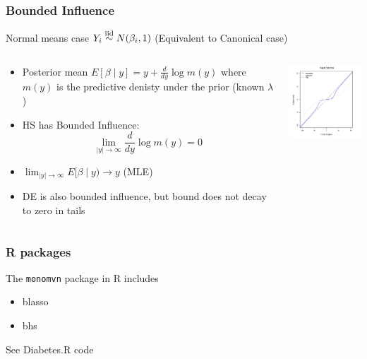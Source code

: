 \documentclass[]{beamer}
\begin{document}
\begin{frame}
  \frametitle{Bounded Influence}
Normal means case      $Y_i \mathrel{\mathop{\sim}\limits^{\rm iid}} N(\beta_i, 1)$    (Equivalent to Canonical case)
    \begin{columns}
    \begin{column}{.48\textwidth}
      \begin{itemize}
      \item 
Posterior mean
$E[\beta \mid y] = y + \frac{d} {d y} \log m(y)$
where $m(y)$ is the predictive denisty under the prior (known $\lambda$) \pause
\item HS has Bounded Influence: $$\lim_{|y| \to \infty} \frac{d}{dy} \log m(y) = 0$$ \pause
\item $\lim_{|y| \to \infty} E[\beta \mid y) \to y $ (MLE)\pause
\item DE is also bounded influence, but bound does not decay to zero in tails
      \end{itemize}

    \end{column}
    \begin{column}{.48\textwidth}
   \includegraphics[width=2in]{shrinkage}
    \end{column}
      
    \end{columns}
\end{frame}

\begin{frame}
  \frametitle{R packages}
  The {\tt monomvn} package in R includes
  \begin{itemize}
  \item blasso
  \item bhs
  \end{itemize}

See Diabetes.R code 


  
\end{frame}
\end{document}
